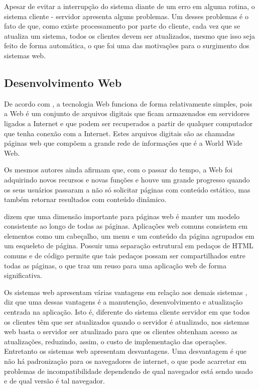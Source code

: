 Apesar de evitar a interrupção do sistema diante de um erro em alguma rotina, o sistema cliente - servidor apresenta alguns problemas. Um desses problemas é o fato de que, como existe processamento por parte do cliente, cada vez que se atualiza um sistema, todos os clientes devem ser atualizados, mesmo que isso seja feito de forma automática, o que foi uma das motivações para o surgimento dos sistemas web.

\subsection{Desenvolvimento Web}
\label{Contex}

De acordo com , a tecnologia Web funciona de forma relativamente simples, pois a Web é um conjunto de arquivos digitais que ficam armazenados em servidores ligados a Internet e que podem ser recuperados a partir de qualquer computador que tenha conexão com a Internet. Estes arquivos digitais são as chamadas páginas web que compõem a grande rede de informações que é a World Wide Web.

Os mesmos autores ainda afirmam que, com o passar do tempo, a Web foi adquirindo novos recursos e novas funções e houve um grande progresso quando os seus usuários passaram a não só solicitar páginas com conteúdo estático, mas também retornar resultados com conteúdo dinâmico.

 dizem que uma dimensão importante para páginas web é manter um modelo consistente ao longo de todas as páginas. Aplicações web comuns consistem em elementos como um cabeçalho, um menu e um conteúdo da página agrupados em um esqueleto de página. Possuir uma separação estrutural em pedaços de HTML comuns e de código permite que tais pedaços possam ser compartilhados entre todas as páginas, o que traz um reuso para uma aplicação web de forma significativa.

Os sistemas web apresentam várias vantagens em relação aos demais sistemas , diz que uma dessas vantagens é a manutenção, desenvolvimento e atualização centrada na aplicação. Isto é, diferente do sistema cliente servidor em que todos os clientes têm que ser atualizados quando o servidor é atualizado, nos sistemas web basta o servidor ser atualizado para que os clientes obtenham acesso as atualizações, reduzindo, assim, o custo de implementação das operações. Entretanto os sistemas web apresentam desvantagens. Uma desvantagem é que não há padronização para os navegadores de internet, o que pode acarretar em problemas de incompatibilidade dependendo de qual navegador está sendo usado e de qual versão é tal navegador.


